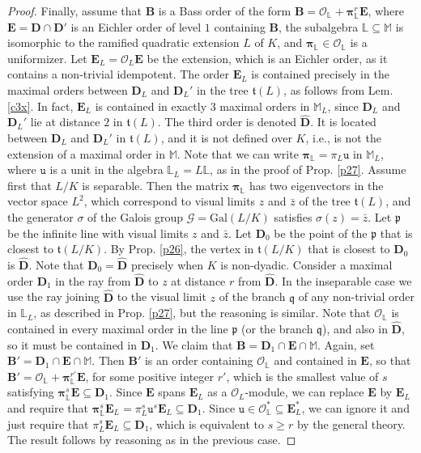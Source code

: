 \documentclass[10pt,a4paper]{amsart}
\newcommand\Ba{\mathbf B}
\newcommand\Da{\mathbf{D}}
\newcommand\Ea{\mathbf{E}}
\newcommand\alge{\mathbb{M}}
\newcommand\lu{\mathbb{L}}
\newcommand\oink{\mathcal O}
\begin{document}
\begin{proof}
Finally, assume that $\Ba$ is a Bass order of the form 
$\Ba=\mathcal{O}_{\lu}+
\boldsymbol\pi_{\lu}^r\Ea$,
where $\Ea=\Da\cap\Da'$ is an 
Eichler order of level $1$
containing $\Ba$, the subalgebra 
$\lu\subseteq\alge $ is isomorphic
to the ramified quadratic 
extension $L$ of $K$,  and 
$\boldsymbol\pi_{\lu}\in\oink_{\lu}$
is a uniformizer. Let 
$\Ea_L=\oink_L\Ea$ be the extension,
which is an Eichler order, as it 
contains a non-trivial
idempotent. The order $\Ea_L$ is
contained precisely 
in the maximal orders between 
$\Da_L$ and $\Da_L'$ 
in the tree $\mathfrak{t}(L)$, 
as follows from Lem.
\ref{c3x}. In fact, $\Ea_L$ is contained
in exactly $3$ maximal orders in $\alge_L$,
since $\Da_L$ and $\Da_L'$ lie at distance $2$ in 
$\mathfrak{t}(L)$. The third order is
denoted $\hat{\Da}$.
It is located between $\Da_L$ and $\Da_L'$ in 
$\mathfrak{t}(L)$, and it is not defined over
$K$, i.e., is not the extension of a maximal 
order in $\alge$.
Note that we can write
$\boldsymbol\pi_{\lu}=
\pi_L\mathtt{u}$ in $\alge_L$, where 
$\mathtt{u}$ is a unit in 
the algebra $\lu_L=L\lu$,
as in the proof of Prop. \ref{p27}.
Assume first that $L/K$ is separable. Then
the matrix $\boldsymbol\pi_{\lu}$ has two 
eigenvectors in the vector 
space $L^2$, which correspond to visual 
limits $z$ and $\bar{z}$ 
of the tree $\mathfrak{t}(L)$, and the 
generator $\sigma$
of the Galois group $\mathcal{G}=
\mathrm{Gal}(L/K)$ 
satisfies $\sigma(z)=\bar{z}$. Let $\mathfrak{p}$
be the infinite line with visual limits 
$z$ and $\bar{z}$.
Let $\Da_0$ be the point of the  $\mathfrak{p}$
that is closest to $\mathfrak{t}(L/K)$.
By Prop. \ref{p26}, the vertex in 
$\mathfrak{t}(L/K)$ that is closest to $\Da_0$
is $\hat{\Da}$. Note that $\Da_0=\hat{\Da}$ 
precisely when $K$ is non-dyadic.
Consider a maximal order $\Da_1$ 
in the ray from $\hat{\Da}$ to $z$ at distance 
$r$ from $\hat{\Da}$. In the inseparable case
we use the ray joining $\hat{\Da}$ to 
the visual limit $z$ of the branch
$\mathfrak{q}$ of any non-trivial
order in $\lu_L$, as described in Prop.
\ref{p27}, but the reasoning is similar.
Note that $\oink_{\lu}$
is contained in every maximal order in the line $\mathfrak{p}$
(or the branch $\mathfrak{q}$),
and also in $\hat{\Da}$, so it must be contained in
$\Da_1$. We claim that
$\Ba=\Da_1\cap\Ea\cap\alge $. Again,
set $\Ba'=\Da_1\cap\Ea\cap\alge $.
Then $\Ba'$ is an order containing $\oink_{\lu}$
and contained in $\Ea$, so that 
$\Ba'=
\mathcal{O}_{\lu}+
\boldsymbol\pi_{\lu}^{r'}\Ea$,
for some positive integer $r'$, which is 
the smallest value of $s$ satisfying
$\boldsymbol\pi_{\lu}^s\Ea\subseteq\Da_1$.
Since $\Ea$ spans $\Ea_L$ as a $\oink_L$-module,
we can replace $\Ea$ by $\Ea_L$ and require that
$\boldsymbol\pi_{\lu}^s\Ea_L=
\pi_L^s\mathtt{u}^s\Ea_L\subseteq\Da_1$.
Since $\mathtt{u}\in\oink_{\lu}^*
\subseteq\Ea_L^*$, we can ignore it 
and just require
that $\pi_L^s\Ea_L\subseteq\Da_1$, which is 
equivalent to $s\geq r$ by the general theory. The result 
follows by reasoning as in the previous case.
\end{proof}
\end{document}
